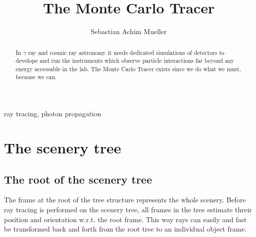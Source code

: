 \documentclass[review]{elsarticle}
\begin{document}
\begin{frontmatter}

\title{%
	The Monte Carlo Tracer%
}


\author[mymainaddress,mysecondaryaddress]{Sebastian Achim Mueller}


\address[mymainaddress]{Institute for Particle Physics, ETH, Otto-Stern-Weg 5, 8093 Zuerich, Switzerland}
\address[mysecondaryaddress]{Experimental Physics 5b, TU Dortmund, Otto-Hahn-Strasse 4, 44227 Dortmund, Germany}
\begin{abstract}
%
In $\gamma$ ray and cosmic ray astronomy it needs dedicated simulations of detectors to develope and run the instruments which observe particle interactions far beyond any energy accessable in the lab.
%
The Monte Carlo Tracer exists since we do what we must, because we can.
%
\end{abstract}
\begin{keyword}
ray tracing, photon propagation
%
\end{keyword}
\end{frontmatter}
\section{The scenery tree}
\subsection{The root of the scenery tree}
\label{SubSecRootFrame}
The frame at the root of the tree structure represents the whole scenery.
%
Before ray tracing is performed on the scenery tree, all frames in the tree estimate threir position and orientation w.r.t. the root frame.
%
This way rays can easily and fast be transformed back and forth from the root tree to an individual object frame.
\end{document}
